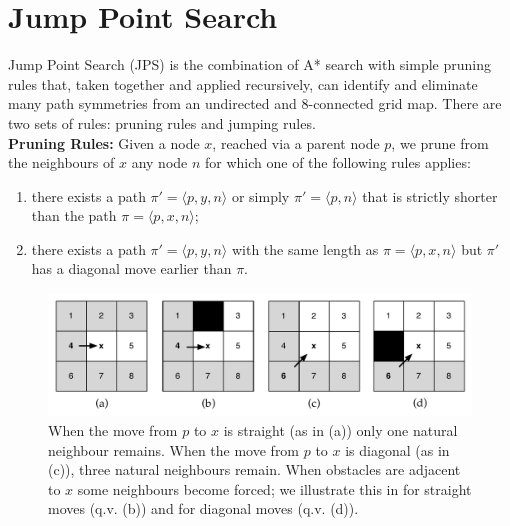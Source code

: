 \section{Jump Point Search}
Jump Point Search (JPS) is the combination of A* search with 
simple pruning rules that, taken together and applied recursively, 
can identify and eliminate many 
path symmetries from an undirected and 8-connected grid map. %
There are two sets of rules: pruning rules and jumping rules. 
\\ \newline
\textbf{Pruning Rules:}
Given a node $x$, reached via a parent node $p$,
we prune from the neighbours of $x$ any node $n$ for which one 
of the following rules applies:
\begin{enumerate}
\item 
  there exists a path $\pi' = \langle p,y,n \rangle$ or simply $\pi' = \langle p, n \rangle$
  that is strictly shorter than the path $\pi = \langle p,x,n \rangle$; 
\item 
  there exists a path $\pi' = \langle p,y,n \rangle$ 
  with the same length as $\pi = \langle p,x,n \rangle$ but $\pi'$ has a 
  diagonal move earlier than $\pi$.  
\end{enumerate}

\begin{figure}[tb]
       \begin{center}
		   \includegraphics[width=\columnwidth]
			{diagrams/pruningrules.pdf}
       \end{center}
	\vspace{-3pt}
       \caption{\small 
When the move from $p$ to $x$ is straight (as in (a)) only one natural neighbour remains.
When the move from $p$ to $x$ is diagonal (as in (c)), three natural neighbours remain. 
When obstacles are adjacent to $x$  some neighbours become forced; we illustrate this
in for straight moves (q.v. (b)) and for diagonal moves (q.v. (d)).
}
       \label{fig:pruning}
\end{figure}

